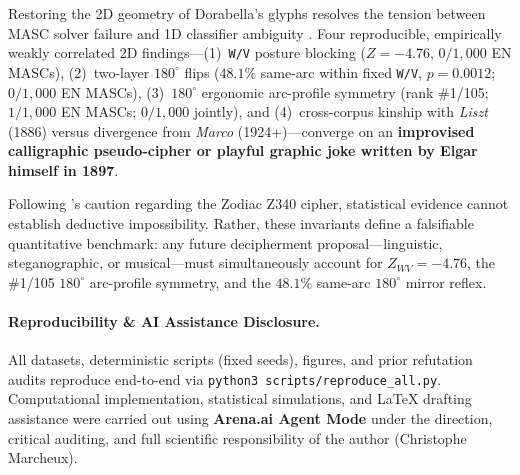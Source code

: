 \documentclass[10pt,a4paper,twocolumn]{article}
\newcommand{\code}[1]{\texttt{\small #1}}
\begin{document}
Restoring the 2D geometry of Dorabella's glyphs resolves the tension between MASC solver failure \citep{hauer2021dorabella,wase2025dorabella} and 1D classifier ambiguity \citep{foxon2024ann,foxon2025ml}. Four reproducible, empirically weakly correlated 2D findings---(1)~\code{W/V} posture blocking ($Z = -4.76$, $0/1{,}000$ EN MASCs), (2)~two-layer $180^\circ$ flips ($48.1\%$ same-arc within fixed \code{W/V}, $p = 0.0012$; $0/1{,}000$ EN MASCs), (3)~$180^\circ$ ergonomic arc-profile symmetry (rank \#1/105; $1/1{,}000$ EN MASCs; $0/1{,}000$ jointly), and (4)~cross-corpus kinship with \emph{Liszt} (1886) versus divergence from \emph{Marco} (1924+)---converge on an \textbf{improvised calligraphic pseudo-cipher or playful graphic joke written by Elgar himself in 1897}.

Following \citet{foxon2024ann}'s caution regarding the Zodiac Z340 cipher, statistical evidence cannot establish deductive impossibility. Rather, these invariants define a falsifiable quantitative benchmark: any future decipherment proposal---linguistic, steganographic, or musical---must simultaneously account for $Z_{WV} = -4.76$, the \#1/105 $180^\circ$ arc-profile symmetry, and the $48.1\%$ same-arc $180^\circ$ mirror reflex.

\paragraph{Reproducibility \& AI Assistance Disclosure.} All datasets, deterministic scripts (fixed seeds), figures, and prior refutation audits reproduce end-to-end via \code{python3 scripts/reproduce\_all.py}. Computational implementation, statistical simulations, and LaTeX drafting assistance were carried out using \textbf{Arena.ai Agent Mode} under the direction, critical auditing, and full scientific responsibility of the author (Christophe Marcheux).


{\scriptsize\setlength{\bibsep}{0.6pt}}
\end{document}
